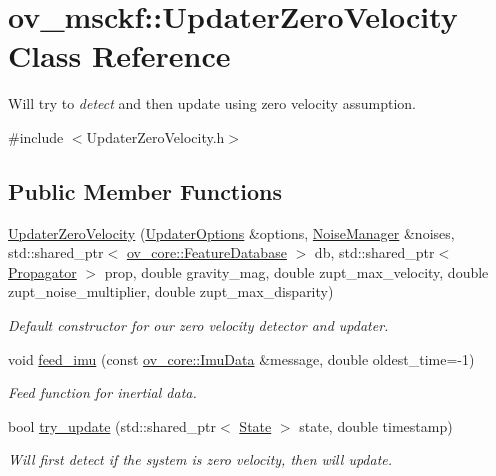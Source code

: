 \hypertarget{classov__msckf_1_1UpdaterZeroVelocity}{}\section{ov\+\_\+msckf\+:\+:Updater\+Zero\+Velocity Class Reference}
\label{classov__msckf_1_1UpdaterZeroVelocity}


Will try to {\itshape detect} and then update using zero velocity assumption.  




{\ttfamily \#include $<$Updater\+Zero\+Velocity.\+h$>$}

\subsection*{Public Member Functions}
\begin{DoxyCompactItemize}
\item 
\hyperlink{classov__msckf_1_1UpdaterZeroVelocity_a1077d2767c078874ed48132ebaa9b975}{Updater\+Zero\+Velocity} (\hyperlink{structov__msckf_1_1UpdaterOptions}{Updater\+Options} \&options, \hyperlink{structov__msckf_1_1NoiseManager}{Noise\+Manager} \&noises, std\+::shared\+\_\+ptr$<$ \hyperlink{classov__core_1_1FeatureDatabase}{ov\+\_\+core\+::\+Feature\+Database} $>$ db, std\+::shared\+\_\+ptr$<$ \hyperlink{classov__msckf_1_1Propagator}{Propagator} $>$ prop, double gravity\+\_\+mag, double zupt\+\_\+max\+\_\+velocity, double zupt\+\_\+noise\+\_\+multiplier, double zupt\+\_\+max\+\_\+disparity)
\begin{DoxyCompactList}\small\item\em Default constructor for our zero velocity detector and updater. \end{DoxyCompactList}\item 
void \hyperlink{classov__msckf_1_1UpdaterZeroVelocity_a85e0ca4c3728853d6e12ae4ec9bf691d}{feed\+\_\+imu} (const \hyperlink{structov__core_1_1ImuData}{ov\+\_\+core\+::\+Imu\+Data} \&message, double oldest\+\_\+time=-\/1)
\begin{DoxyCompactList}\small\item\em Feed function for inertial data. \end{DoxyCompactList}\item 
bool \hyperlink{classov__msckf_1_1UpdaterZeroVelocity_a703a198829da68f905280ce8af8aa9e6}{try\+\_\+update} (std\+::shared\+\_\+ptr$<$ \hyperlink{classov__msckf_1_1State}{State} $>$ state, double timestamp)
\begin{DoxyCompactList}\small\item\em Will first detect if the system is zero velocity, then will update. \end{DoxyCompactList}\end{DoxyCompactItemize}
